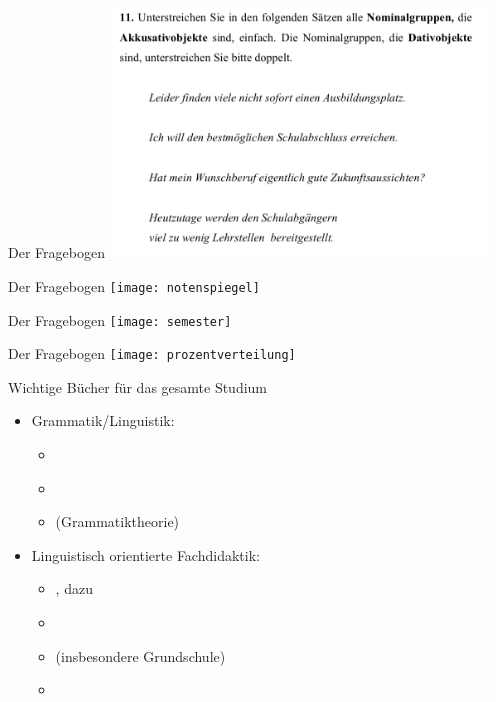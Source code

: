 \begin{frame}
  {Der Fragebogen}
  \pause
  \centering
  \includegraphics[width=0.75\textwidth]{graphics/05}
\end{frame}

\begin{frame}
  {Der Fragebogen}
  \pause
  \centering
  \texttt{[image: notenspiegel]}
\end{frame}

\begin{frame}
  {Der Fragebogen}
  \pause
  \centering
  \texttt{[image: semester]}
\end{frame}

\begin{frame}
  {Der Fragebogen}
  \pause
  \centering
  \texttt{[image: prozentverteilung]}
\end{frame}

\begin{frame}
  {Wichtige Bücher für das gesamte Studium}
  \pause
  \begin{itemize}[<+->]
    \item Grammatik\slash Linguistik:
      \begin{itemize}[<+->]
        \item \alert{\citet{Eisenberg2013a}}
        \item \alert{\citet{Eisenberg2013b}}
        \item \citet{Mueller2018} (Grammatiktheorie)
      \end{itemize}
    \vspace{\baselineskip}
    \item Linguistisch orientierte Fachdidaktik:
      \begin{itemize}[<+->]
        \item \alert{\citet{Menzel2017}}, dazu \citet{EisenbergMenzel1995}
        \item \alert{\citet{Bredel2013}}
        \item \citet{BredelEa2017} (insbesondere Grundschule)
        \item \citet{BredelPieper2015}
      \end{itemize}
  \end{itemize}
\end{frame}

